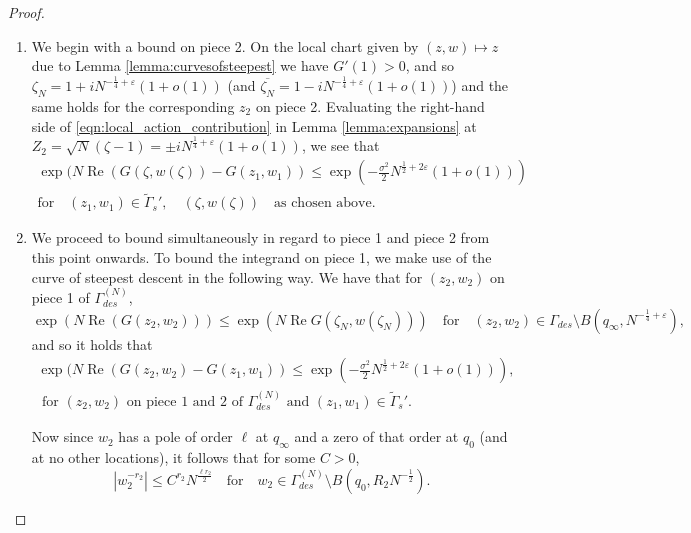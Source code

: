 \documentclass[11pt]{article}
\theoremstyle{plain}
\theoremstyle{definition}
\numberwithin{equation}{section}
\DeclareMathOperator{\re}{Re}
\begin{document}
\begin{proof}
\begin{enumerate}
 \item
We begin with a bound on piece 2. 
On the local chart given by $(z,w)\mapsto z$ due to Lemma \ref{lemma:curvesofsteepest} we have $G'(1)>0$, and so 
 $\zeta_N=1+iN^{-\frac{1}{4}+\varepsilon}(1+o(1))$ (and $\overline{\zeta_N}= 1-iN^{-\frac{1}{4}+\varepsilon}(1+o(1))$)
and the same holds for the corresponding $z_2$ on piece 2.
  Evaluating the right-hand side of \eqref{eqn:local_action_contribution} in Lemma \ref{lemma:expansions} at
 $Z_2=\sqrt{N}(\zeta-1)=\pm iN^{\frac{1}{4}+\varepsilon}(1+o(1))$, 
we see that 
 \begin{multline}\label{eqn:on_arc}
\exp(N\re(G(\zeta,w(\zeta))-G(z_1,w_1))
 \leq \exp\left(-\frac{\sigma^2}{2} N^{\frac{1}{2}+2\varepsilon}(1+o(1))\right)
 \quad
 \\
 \text{for}
 \quad
 (z_1,w_1)\in \widetilde{\Gamma}_s',
\quad (\zeta, w(\zeta))\quad \text{as chosen above.}
\end{multline}
\item
We proceed to bound simultaneously in regard to piece 1 and piece 2 from this point onwards.  To bound the integrand on piece 1, we make use of the curve of steepest descent in the following way. We have that for $(z_2, w_2)$ on piece 1 of $\Gamma_{des}^{(N)}$,
 \begin{equation}
\exp(N\re(G(z_2,w_2)))
 \leq
  \exp\left(N\re G(\zeta_N, w(\zeta_N))\right)
 \quad \text{for} 
 \quad (z_2,w_2)
 \in \Gamma_{des}\setminus B(q_{\infty}, N^{-\frac{1}{4}+\varepsilon}),
 \end{equation}
and so it holds that
%
%
 \begin{multline}\label{eqn:steepestdescentafb}
 \exp(N\re(G(z_2,w_2)-G(z_1,w_1))
 \leq \exp\left(-\frac{\sigma^2}{2} N^{\frac{1}{2}+2\varepsilon}(1+o(1))\right),%
 \\ \text{ for }
 (z_2,w_2)\text{ on piece 1 and 2 of $\Gamma_{des}^{(N)}$ and }
 (z_1,w_1)\in \widetilde{\Gamma}_s'.
 \end{multline}
%


Now since $w_2$ has a pole of order $\ell$ at $q_{\infty}$ and a zero of that order at $q_0$ (and at no other locations), it follows that for some $C>0$,
\begin{equation} \label{eqn:w_2_global_bound}
|w_2^{-r_2}|\leq C^{{r_2}} %
N^{\frac{\ell r_2}{2}} \quad \text{for}\quad w_2\in\Gamma_{des}^{(N)}\setminus B(q_0, {R_2}N^{-\frac{1}{2}}).
\end{equation}


\end{enumerate}
\end{proof}
\end{document}
